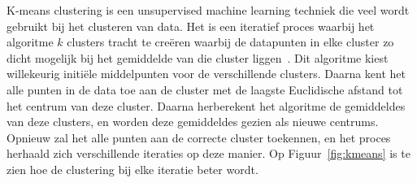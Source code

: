 K-means clustering is een unsupervised machine learning techniek die veel wordt
gebruikt bij het clusteren van data. Het is een iteratief proces waarbij het
algoritme $k$ clusters tracht te creëren waarbij de datapunten in elke cluster
zo dicht mogelijk bij het gemiddelde van die cluster
liggen~\cite{Understa24:online}. Dit algoritme kiest willekeurig initiële
middelpunten voor de verschillende clusters. Daarna kent het alle punten in de
data toe aan de cluster met de laagste Euclidische afstand tot het centrum van
deze cluster. Daarna herberekent het algoritme de gemiddeldes van deze
clusters, en worden deze gemiddeldes gezien als nieuwe centrums. Opnieuw zal
het alle punten aan de correcte cluster toekennen, en het proces herhaald zich
verschillende iteraties op deze manier. Op Figuur~\ref{fig:kmeans} is te zien
hoe de clustering bij elke iteratie beter wordt.

